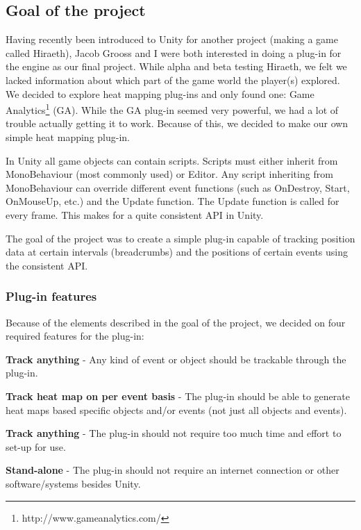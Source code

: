\subsection{Goal of the project}
\label{PO_goal}
Having recently been introduced to Unity for another project (making a game called Hiraeth), Jacob Grooss and I were both interested in doing a plug-in for the engine as our final project. While alpha and beta testing Hiraeth, we felt we lacked information about which part of the game world the player(s) explored. We decided to explore heat mapping plug-ins and only found one: Game Analytics\footnote{http://www.gameanalytics.com/} (GA). While the GA plug-in seemed very powerful, we had a lot of trouble actually getting it to work. Because of this, we decided to make our own simple heat mapping plug-in.

In Unity all game objects can contain scripts. Scripts must either inherit from MonoBehaviour (most commonly used) or Editor. Any script inheriting from MonoBehaviour can override different event functions (such as OnDestroy, Start, OnMouseUp, etc.) and the Update function. The Update function is called for every frame. This makes for a quite consistent API in Unity.

The goal of the project was to create a simple plug-in capable of tracking position data at certain intervals (breadcrumbs) and the positions of certain events using the consistent API. 

\subsubsection{Plug-in features}
\label{PO_features}
Because of the elements described in the goal of the project, we decided on four required features for the plug-in:
\begin{my_itemize}
\item \textbf{Track anything} - Any kind of event or object should be trackable through the plug-in.
\item \textbf{Track heat map on per event basis} - The plug-in should be able to generate heat maps based specific objects and/or events (not just all objects and events).
\item \textbf{Track anything} - The plug-in should not require too much time and effort to set-up for use.
\item \textbf{Stand-alone} - The plug-in should not require an internet connection or other software/systems besides Unity.
\end{my_itemize}